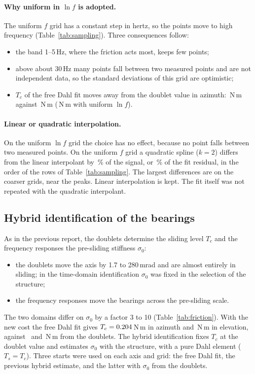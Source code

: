 \documentclass[10pt,a4paper]{article}
\numberwithin{equation}{section}
\begin{document}
\paragraph{Why uniform in $\ln f$ is adopted.} The uniform $f$ grid has a constant step in hertz, so the points move to high frequency (Table~\ref{tab:sampling}). Three consequences follow:
\begin{itemize}
\item the band 1--5\,Hz, where the friction acts most, keeps few points;
\item above about 30\,Hz many points fall between two measured points and are not independent data, so the standard deviations of this grid are optimistic;
\item $T_c$ of the free Dahl fit moves away from the doublet value in azimuth: \TcFreeFA\,N\,m against \TcHA\,N\,m (\TcFreeA\,N\,m with uniform $\ln f$).
\end{itemize}

\paragraph{Linear or quadratic interpolation.} On the uniform $\ln f$ grid the choice has no effect, because no point falls between two measured points. On the uniform $f$ grid a quadratic spline ($k=2$) differs from the linear interpolant by \quadSignal\,\% of the signal, or \quadResidual\,\% of the fit residual, in the order of the rows of Table~\ref{tab:sampling}. The largest differences are on the coarser grids, near the peaks. Linear interpolation is kept. The fit itself was not repeated with the quadratic interpolant.

\subsection{Hybrid identification of the bearings}
As in the previous report, the doublets determine the sliding level $T_c$ and the frequency responses the pre-sliding stiffness $\sigma_0$:
\begin{itemize}
\item the doublets move the axis by 1.7 to 280\,mrad and are almost entirely in sliding; in the time-domain identification $\sigma_0$ was fixed in the selection of the structure;
\item the frequency responses move the bearings across the pre-sliding scale.
\end{itemize}
The two domains differ on $\sigma_0$ by a factor 3 to 10 (Table~\ref{tab:friction}). With the new cost the free Dahl fit gives $T_c=0.204$\,N\,m in azimuth and \TcFreeP\,N\,m in elevation, against \TcHA\ and \TcHP\,N\,m from the doublets. The hybrid identification fixes $T_c$ at the doublet value and estimates $\sigma_0$ with the structure, with a pure Dahl element ($T_s=T_c$). Three starts were used on each axis and grid: the free Dahl fit, the previous hybrid estimate, and the latter with $\sigma_0$ from the doublets.
\end{document}

